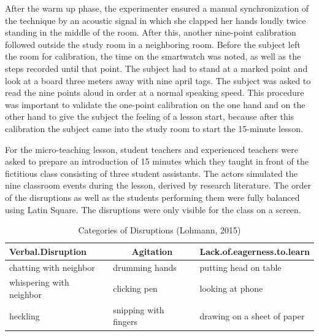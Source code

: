\documentclass[
  man]{apa6}
\begin{document}
After the warm up phase, the experimenter ensured a manual synchronization of the technique by an acoustic signal in which she clapped her hands loudly twice standing in the middle of the room. After this, another nine-point calibration followed outside the study room in a neighboring room. Before the subject left the room for calibration, the time on the smartwatch was noted, as well as the steps recorded until that point. The subject had to stand at a marked point and look at a board three meters away with nine april tags. The subject was asked to read the nine points aloud in order at a normal speaking speed. This procedure was important to validate the one-point calibration on the one hand and on the other hand to give the subject the feeling of a lesson start, because after this calibration the subject came into the study room to start the 15-minute lesson.

For the micro-teaching lesson, student teachers and experienced teachers were asked to prepare an introduction of 15 minutes which they taught in front of the fictitious class consisting of three student assistants. The actors simulated the nine classroom events during the lesson, derived by research literature. The order of the disruptions as well as the students performing them were fully balanced using Latin Square. The disruptions were only visible for the class on a screen.

\begin{table}[h]

\begin{center}
\begin{threeparttable}

\caption{\label{tab:disruption_categories}Categories of Disruptions (Lohmann, 2015)}

\tiny{

\begin{tabular}{lll}
\toprule
Verbal.Disruption & \multicolumn{1}{c}{Agitation} & \multicolumn{1}{c}{Lack.of.eagerness.to.learn}\\
\midrule
chatting with neighbor & drumming hands & putting head on table\\
whispering with neighbor & clicking pen & looking at phone\\
heckling & snipping with fingers & drawing on a sheet of paper\\
\bottomrule
\end{tabular}

}

\end{threeparttable}
\end{center}

\end{table}
\end{document}
